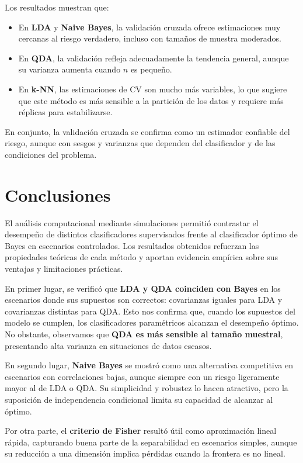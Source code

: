 \documentclass[10pt]{article}
\begin{document}
Los resultados muestran que:
\begin{itemize}
    \item En \textbf{LDA} y \textbf{Naive Bayes}, la validación cruzada ofrece estimaciones muy cercanas al riesgo verdadero, incluso con tamaños de muestra moderados.
    \item En \textbf{QDA}, la validación refleja adecuadamente la tendencia general, aunque su varianza aumenta cuando $n$ es pequeño.
    \item En \textbf{k-NN}, las estimaciones de CV son mucho más variables, lo que sugiere que este método es más sensible a la partición de los datos y requiere más réplicas para estabilizarse.
\end{itemize}

En conjunto, la validación cruzada se confirma como un estimador confiable del riesgo, aunque con sesgos y varianzas que dependen del clasificador y de las condiciones del problema.




\section*{Conclusiones}

El análisis computacional mediante simulaciones permitió contrastar el desempeño de distintos clasificadores supervisados frente al clasificador óptimo de Bayes en escenarios controlados. 
Los resultados obtenidos refuerzan las propiedades teóricas de cada método y aportan evidencia empírica sobre sus ventajas y limitaciones prácticas.

En primer lugar, se verificó que \textbf{LDA y QDA coinciden con Bayes} en los escenarios donde sus supuestos son correctos: covarianzas iguales para LDA y covarianzas distintas para QDA. 
Esto nos confirma que, cuando los supuestos del modelo se cumplen, los clasificadores paramétricos alcanzan el desempeño óptimo. 
No obstante, observamos que \textbf{QDA es más sensible al tamaño muestral}, presentando alta varianza en situaciones de datos escasos.

En segundo lugar, \textbf{Naive Bayes} se mostró como una alternativa competitiva en escenarios con correlaciones bajas, aunque siempre con un riesgo ligeramente mayor al de LDA o QDA. 
Su simplicidad y robustez lo hacen atractivo, pero la suposición de independencia condicional limita su capacidad de alcanzar al óptimo.

Por otra parte, el \textbf{criterio de Fisher} resultó útil como aproximación lineal rápida, capturando buena parte de la separabilidad en escenarios simples, aunque su reducción a una dimensión implica pérdidas cuando la frontera es no lineal.
\end{document}
